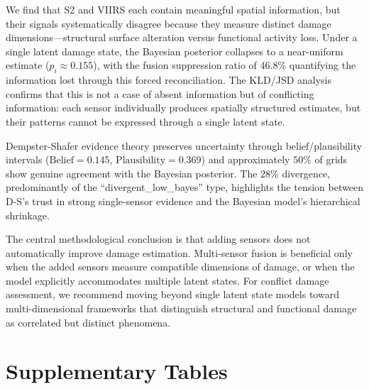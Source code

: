 \documentclass[wcp]{jmlr}
\begin{document}
We find that S2 and VIIRS each contain meaningful spatial information, but
their signals systematically disagree because they measure distinct damage
dimensions---structural surface alteration versus functional activity loss.
Under a single latent damage state, the Bayesian posterior collapses to a
near-uniform estimate ($p_i \approx 0.155$), with the fusion suppression
ratio of $46.8\%$ quantifying the information lost through this forced
reconciliation. The KLD/JSD analysis confirms that this is not a case of
absent information but of conflicting information: each sensor individually
produces spatially structured estimates, but their patterns cannot be
expressed through a single latent state.

Dempster-Shafer evidence theory preserves uncertainty through
belief/plausibility intervals ($\text{Belief}=0.145$,
$\text{Plausibility}=0.369$) and approximately $50\%$ of grids show genuine
agreement with the Bayesian posterior. The $28\%$ divergence, predominantly
of the ``divergent\_low\_bayes'' type, highlights the tension between D-S's
trust in strong single-sensor evidence and the Bayesian model's hierarchical
shrinkage.

The central methodological conclusion is that adding sensors does not
automatically improve damage estimation. Multi-sensor fusion is beneficial
only when the added sensors measure compatible dimensions of damage, or when
the model explicitly accommodates multiple latent states. For conflict
damage assessment, we recommend moving beyond single latent state models
toward multi-dimensional frameworks that distinguish structural and
functional damage as correlated but distinct phenomena.





\appendix

\section{Supplementary Tables}\label{apd:tables}
\end{document}

